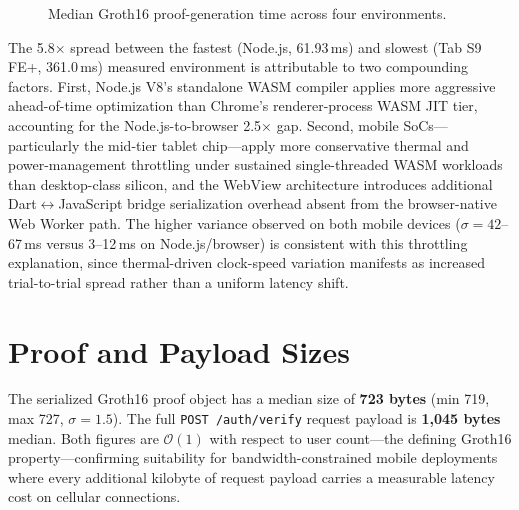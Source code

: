 \documentclass[12pt,a4paper,oneside]{report}
\newcommand{\simplebar}[6]{%
  \draw[fill=#5,draw=black!60] (#1,0) rectangle ++(#3,#4);%
  \node[barlabel,above] at (#1+0.5*#3,#4) {#6};%
}
\begin{document}
\begin{figure}[htbp]
\centering
{}
\caption{Median Groth16 proof-generation time across four environments.}
\label{fig:env_comparison}
\end{figure}

The 5.8$\times$ spread between the fastest (Node.js, 61.93\,ms) and
slowest (Tab S9 FE+, 361.0\,ms) measured environment is attributable to
two compounding factors. First, Node.js V8's standalone WASM compiler
applies more aggressive ahead-of-time optimization than Chrome's
renderer-process WASM JIT tier, accounting for the Node.js-to-browser
2.5$\times$ gap. Second, mobile SoCs---particularly the mid-tier tablet
chip---apply more conservative thermal and power-management throttling
under sustained single-threaded WASM workloads than desktop-class
silicon, and the WebView architecture introduces additional
Dart$\leftrightarrow$JavaScript bridge serialization overhead absent from
the browser-native Web Worker path. The higher variance observed on both
mobile devices ($\sigma=42$--67\,ms versus 3--12\,ms on Node.js/browser)
is consistent with this throttling explanation, since thermal-driven
clock-speed variation manifests as increased trial-to-trial spread rather
than a uniform latency shift.

\section{Proof and Payload Sizes}

The serialized Groth16 proof object has a median size of \textbf{723
bytes} (min 719, max 727, $\sigma=1.5$). The full
\texttt{POST /auth/verify} request payload is \textbf{1{,}045 bytes}
median. Both figures are $\mathcal{O}(1)$ with respect to user
count---the defining Groth16 property---confirming suitability for
bandwidth-constrained mobile deployments where every additional kilobyte
of request payload carries a measurable latency cost on cellular
connections.
\end{document}
